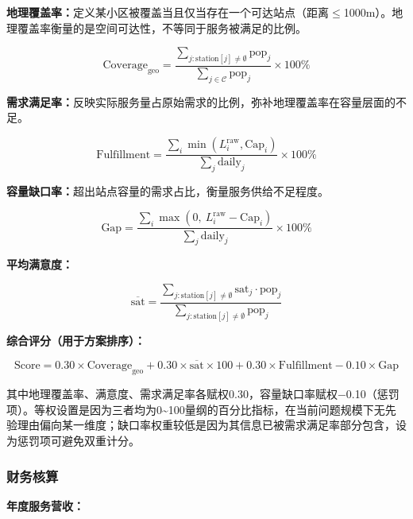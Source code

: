 \documentclass[UTF8]{ctexart}
\begin{document}
\textbf{地理覆盖率：}定义某小区被覆盖当且仅当存在一个可达站点（距离$\leq$1000m）。地理覆盖率衡量的是空间可达性，不等同于服务被满足的比例。

\begin{equation}
\text{Coverage}_{\text{geo}} = \frac{\sum_{j:\text{station}[j]\neq\emptyset} \text{pop}_j}{\sum_{j\in\mathcal{C}} \text{pop}_j} \times 100\% \tag{2.12}
\end{equation}

\textbf{需求满足率：}反映实际服务量占原始需求的比例，弥补地理覆盖率在容量层面的不足。

\begin{equation}
\text{Fulfillment} = \frac{\sum_i \min(L_i^{\text{raw}}, \text{Cap}_i)}{\sum_j \text{daily}_j} \times 100\% \tag{2.12a}
\end{equation}

\textbf{容量缺口率：}超出站点容量的需求占比，衡量服务供给不足程度。

\begin{equation}
\text{Gap} = \frac{\sum_i \max(0,\ L_i^{\text{raw}} - \text{Cap}_i)}{\sum_j \text{daily}_j} \times 100\% \tag{2.12b}
\end{equation}

\textbf{平均满意度：}

\begin{equation}
\overline{\text{sat}} = \frac{\sum_{j:\text{station}[j]\neq\emptyset} \text{sat}_j \cdot \text{pop}_j}{\sum_{j:\text{station}[j]\neq\emptyset} \text{pop}_j} \tag{2.13}
\end{equation}

\textbf{综合评分（用于方案排序）：}

\begin{equation}
\text{Score} = 0.30 \times \text{Coverage}_{\text{geo}} + 0.30 \times \overline{\text{sat}} \times 100 + 0.30 \times \text{Fulfillment} - 0.10 \times \text{Gap} \tag{2.14}
\end{equation}

其中地理覆盖率、满意度、需求满足率各赋权0.30，容量缺口率赋权$-$0.10（惩罚项）。等权设置是因为三者均为0\textasciitilde100量纲的百分比指标，在当前问题规模下无先验理由偏向某一维度；缺口率权重较低是因为其信息已被需求满足率部分包含，设为惩罚项可避免双重计分。

\subsubsection{财务核算}

\textbf{年度服务营收：}
\end{document}
